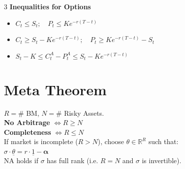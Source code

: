 \documentclass[8pt, a4paper, landscape]{extarticle}
\begin{document}
\begin{multicols*}{3}
\textbf{Inequalities for Options}
\begin{itemize}
    \item $C_t \le S_t; \quad P_t \le K e^{-r(T-t)}$
    \item $C_t \ge S_t - K e^{-r(T-t)}; \quad P_t \ge K e^{-r(T-t)} - S_t$
    \item $S_t - K \le C_t^A - P_t^A \le S_t - K e^{-r(T-t)}$
\end{itemize}

\section*{Meta Theorem}
$R = \#$ BM, $N = \#$ Risky Assets. \\
\textbf{No Arbitrage} $\iff R \ge N$ \\
\textbf{Completeness} $\iff R \le N$ \\
If market is incomplete ($R > N$), choose $\theta \in \mathbb{R}^R$ such that: \\
$\sigma \cdot \underline{\theta} = r \cdot \underline{1} - \mathbf{\alpha}$ \\
NA holds if $\sigma$ has full rank (i.e. $R=N$ and $\sigma$ is invertible).


\end{multicols*}
\end{document}
